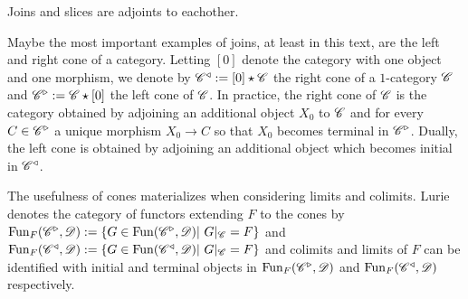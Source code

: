 \documentclass[../../thesis.tex]{subfiles}
\begin{document}
\begin{remark}
    Joins and slices are adjoints to eachother.
\end{remark}
\begin{example}
    Maybe the most important examples of joins, at least in this text, are the left and right cone of a category.
    Letting $[0]$ denote the category with one object and one morphism, we denote by $\mathscr{C}^{\triangleleft}: = [0] \star \mathscr{C}$ the right cone of a $1$-category $\mathscr{C}$ and $\mathscr{C}^{\triangleright}:=\mathscr{C} \star [0]$ the left cone of $\mathscr{C}$.
    In practice, the right cone of $\mathscr{C}$ is the category obtained by adjoining an additional object $X_0$ to $\mathscr{C}$ and for every $C \in \mathscr{C}^{\triangleright}$ a unique morphism $X_0 \to C$ so that $X_0$ becomes terminal in $\mathscr{C}^{\triangleright}$.
    Dually, the left cone is obtained by adjoining an additional object which becomes initial in $\mathscr{C}^{\triangleleft}$.
\end{example}
The usefulness of cones materializes when considering limits and colimits.
Lurie denotes the category of functors extending $F$ to the cones by $\Fun_F(\C^{\triangleright}, \D) : = \{G \in \Fun(\C^{\triangleright}, \D) | G|_{\C} = F\}$ and $\Fun_F(\C^{\triangleleft}, \D): = \{G \in \Fun(\C^{\triangleleft}, \D) | G|_{\C} = F\}$ and colimits and limits of $F$ can be identified with initial and terminal objects in $\mathrm{Fun}_F(\mathscr{C}^{\triangleright}, \mathscr{D})$ and $\mathrm{Fun}_F(\mathscr{C}^{\triangleleft}, \mathscr{D})$ respectively.
\end{document}
